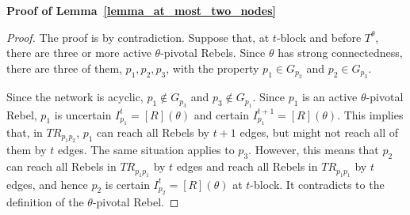 \documentclass[12pt,letter]{article}
\newtheorem*{lemma*}{Lemma}
\theoremstyle{definition}
\theoremstyle{definition}
\theoremstyle{remark}
\theoremstyle{claim}
\begin{document}
\noindent\textbf{Proof of Lemma~\ref{lemma_at_most_two_nodes}} 
   
\begin{proof}
The proof is by contradiction. Suppose that, at $t$-block and before $T^{\theta}$, there are three or more active $\theta$-pivotal Rebels. Since $\theta$ has strong connectedness, there are three of them, $p_1,p_2,p_3$, with the property $p_1\in G_{p_2}$ and $p_2 \in G_{p_3}$. 

Since the network is acyclic, $p_1\notin G_{p_3}$ and $p_3\notin G_{p_1}$. Since $p_1$ is an active $\theta$-pivotal Rebel, $p_1$ is uncertain  $I^t_{p_1}= [R](\theta)$ and certain $I^{t+1}_{p_1}=[R](\theta)$. This implies that, in $TR_{p_1p_2}$, $p_1$ can reach all Rebels by $t+1$ edges, but might not reach all of them by $t$ edges. The same situation applies to $p_3$. However, this means that $p_2$ can reach all Rebels in $TR_{p_1p_1}$ by $t$ edges and reach all Rebels in $TR_{p_1p_1}$ by $t$ edges, and hence $p_2$ is certain $I^t_{p_2}=[R](\theta)$ at $t$-block. It contradicts to the definition of the $\theta$-pivotal Rebel.

\end{proof}
\end{document}
